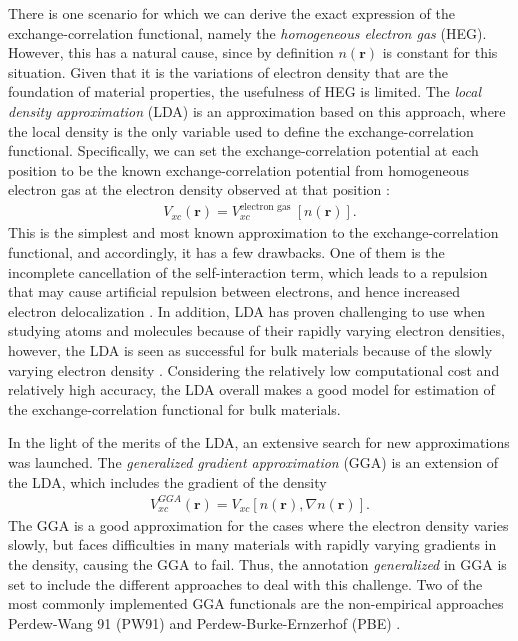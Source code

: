 There is one scenario for which we can derive the exact expression of the exchange-correlation functional, namely the \textit{homogeneous electron gas} (HEG). However, this has a natural cause, since by definition $n(\boldsymbol{r})$ is constant for this situation. Given that it is the variations of electron density that are the foundation of material properties, the usefulness of HEG is limited. The \textit{local density approximation} (LDA) is an approximation based on this approach, where the local density is the only variable used to define the exchange-correlation functional. Specifically, we can set the exchange-correlation potential at each position to be the known exchange-correlation potential from homogeneous electron gas at the electron density observed at that position \cite{Kohn1965}:
\begin{align}
  V_{xc}(\boldsymbol{r}) = V_{xc}^{\text{electron gas }}\left[n(\boldsymbol{r})\right].
\end{align}
This is the simplest and most known approximation to the exchange-correlation functional, and accordingly, it has a few drawbacks. One of them is the incomplete cancellation of the self-interaction term, which leads to a repulsion that may cause artificial repulsion between electrons, and hence increased electron delocalization \cite{Allen2014}. In addition, LDA has proven challenging to use when studying atoms and molecules because of their rapidly varying electron densities, however, the LDA is seen as successful for bulk materials because of the slowly varying electron density \cite{DavidSholl2009}. Considering the relatively low computational cost and relatively high accuracy, the LDA overall makes a good model for estimation of the exchange-correlation functional for bulk materials.

In the light of the merits of the LDA, an extensive search for new approximations was launched. The \textit{generalized gradient approximation} (GGA) is an extension of the LDA, which includes the gradient of the density
\begin{align}
  V_{xc}^{GGA}(\boldsymbol{r}) = V_{xc}\left[ n(\boldsymbol{r}), \nabla n (\boldsymbol{r})\right].
\end{align}
The GGA is a good approximation for the cases where the electron density varies slowly, but faces difficulties in many materials with rapidly varying gradients in the density, causing the GGA to fail. Thus, the annotation \textit{generalized} in GGA is set to include the different approaches to deal with this challenge. Two of the most commonly implemented GGA functionals are the non-empirical approaches Perdew-Wang 91 (PW91) \cite{Perdew1992} and Perdew-Burke-Ernzerhof (PBE) \cite{Perdew1996}.

